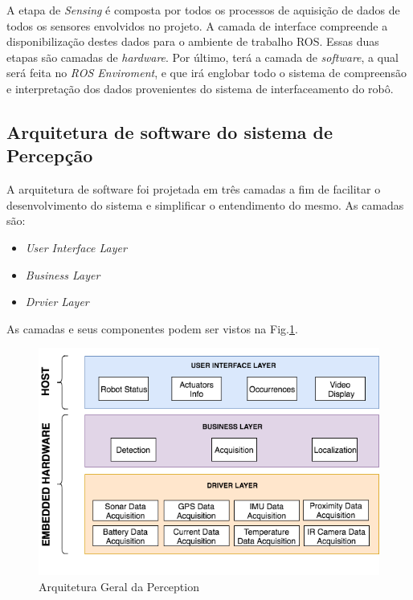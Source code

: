  A etapa de \textit{Sensing} é composta por todos os processos de aquisição de dados de todos os sensores envolvidos no projeto. A camada de interface compreende a disponibilização destes dados para o ambiente de trabalho ROS. Essas duas etapas são camadas de \textit{hardware}. Por último, terá a camada de \textit{software}, a qual será feita no \textit{ROS Enviroment}, e que irá englobar todo o sistema de compreensão e interpretação dos dados provenientes do sistema de interfaceamento do robô.
 

\subsection{Arquitetura de software do sistema de Percepção}
\label{ssec:arqsp}


A arquitetura de software foi projetada em três camadas a fim de facilitar o desenvolvimento do sistema e simplificar o entendimento do mesmo. As camadas são:

\begin{itemize}
	\item \textit{User Interface Layer}
	\item \textit{Business Layer}
	\item \textit{Drvier Layer}
\end{itemize}
 
As camadas e seus componentes podem ser vistos na Fig.\ref{arqsoft}.

\begin{figure}[h]
	\centering
	\includegraphics[width=15cm]{Figures/ArquiteturadeSoftware.png}
	\caption{Arquitetura Geral da Perception}
	\label{arqsoft}
\end{figure}

